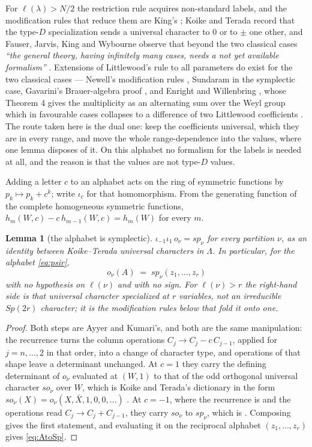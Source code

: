 \documentclass[11pt,reqno]{amsart}
\theoremstyle{plain}
\newtheorem{lemma}[theorem]{Lemma}
\theoremstyle{definition}
\begin{document}
For $\ell(\lambda)>N/2$ the restriction rule acquires non-standard labels, and the modification rules
that reduce them are King's \cite{King71}; Koike and Terada \cite{KT87} record that the
type-$D$ specialization sends a universal character to $0$ or to $\pm$ one other, and Fauser, Jarvis,
King and Wybourne observe that beyond the two classical cases \emph{``the general theory, having
infinitely many cases, needs a not yet available formalism''} \cite[\S4]{FJKW05}. Extensions of Littlewood's rule to all parameters do exist for the two classical
cases --- Newell's modification rules \cite{New51}, Sundaram \cite{Sun90} in the symplectic case,
Gavarini's Brauer-algebra proof \cite{Gav99}, and Enright and Willenbring \cite{EW04}, whose Theorem 4
gives the multiplicity as an alternating sum over the Weyl group which in favourable cases collapses
to a difference of two Littlewood coefficients \cite[\S7.11]{EW04}. The route taken here is the dual
one: keep the coefficients universal, which they are in every range, and move the whole
range-dependence into the values, where one lemma disposes of it. On this alphabet no formalism for
the labels is needed at all, and the reason is that the values are not type-$D$ values.

Adding a letter $c$ to an alphabet acts on the ring of symmetric functions by $p_k\mapsto p_k+c^k$;
write $\iota_c$ for that homomorphism. From the generating function of the complete homogeneous
symmetric functions, $h_m(W,c)-c\,h_{m-1}(W,c)=h_m(W)$ for every $m$.

\begin{lemma}[the alphabet is symplectic]\label{lem:AtoSp}
$\iota_{-1}\iota_{1}\,o_\nu=sp_\nu$ for every partition $\nu$, as an identity between Koike--Terada
\emph{universal} characters in $\Lambda$. In particular, for the alphabet
\eqref{eq:psir},
\begin{equation}\label{eq:AtoSp}
o_\nu(A)\;=\;sp_\nu(z_1,\dots,z_r)
\end{equation}
with no hypothesis on $\ell(\nu)$ and with no sign. For $\ell(\nu)>r$ the right-hand side is
that universal character specialized at $r$ variables, not an irreducible $Sp(2r)$ character; it is
the modification rules below that fold it onto one.
\end{lemma}

\begin{proof}
Both steps are Ayyer and Kumari's, and both are the same manipulation: the recurrence turns the
column operations $C_j\to C_j-c\,C_{j-1}$, applied for $j=n,\dots,2$ in that order, into a change of
character type, and operations of that shape leave a determinant unchanged. At $c=1$ they carry the
defining determinant of $o_\nu$ evaluated at $(W,1)$ to that of the odd orthogonal universal
character $so_\nu$ over $W$, which is Koike and Terada's dictionary in the form
$so_\nu(X)=o_\nu(X,\bar X,1,0,0,\dots)$ \cite[(2.13)]{AK25}. At $c=-1$, where the recurrence is
\cite[Proposition 2.1]{AK25} and the operations read $C_j\to C_j+C_{j-1}$, they carry $so_\nu$ to
$sp_\nu$, which is \cite[Lemma 3.2]{AK25}. Composing gives the first statement, and evaluating it on
the reciprocal alphabet $(z_1,\dots,z_r)$ gives \eqref{eq:AtoSp}.
\end{proof}
\end{document}
